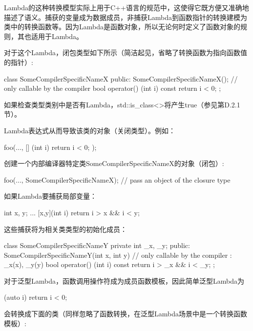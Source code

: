 \begin{notice}
Lambda的这种转换模型实际上用于C++语言的规范中，这使得它既方便又准确地描述了语义。捕获的变量成为数据成员，非捕获Lambda到函数指针的转换建模为类中的转换函数等。因为Lambda是函数对象，所以无论何时定义了函数对象的规则，其也适用于Lambda。
\end{notice}

对于这个Lambda，闭包类型如下所示（简洁起见，省略了转换函数为指向函数值的指针）:

\begin{cpp}
class SomeCompilerSpecificNameX
{
	public:
	SomeCompilerSpecificNameX(); // only callable by the compiler
	bool operator() (int i) const
	{
		return i < 0;
	}
};
\end{cpp}

如果检查类型类别中是否有Lambda，std::is\_class<>将产生true（参见第D.2.1节）。

Lambda表达式从而导致该类的对象（关闭类型）。例如：

\begin{cpp}
foo(...,
	[] (int i) {
		return i < 0;
	});
\end{cpp}

创建一个内部编译器特定类SomeCompilerSpecificNameX的对象（闭包）:

\begin{cpp}
foo(...,
	SomeCompilerSpecificNameX{}); // pass an object of the closure type
\end{cpp}

如果Lambda要捕获局部变量：

\begin{cpp}
int x, y;
...
[x,y](int i) {
	return i > x && i < y;
}
\end{cpp}

这些捕获将为相关类类型的初始化成员：

\begin{cpp}
class SomeCompilerSpecificNameY {
private
	int _x, _y;
public:
	SomeCompilerSpecificNameY(int x, int y) // only callable by the compiler
	: _x(x), _y(y) {
	}
	bool operator() (int i) const {
		return i > _x && i < _y;
	}
};
\end{cpp}

对于泛型Lambda，函数调用操作符成为成员函数模板，因此简单泛型Lambda为

\begin{cpp}
[] (auto i) {
	return i < 0;
}
\end{cpp}

会转换成下面的类（同样忽略了函数转换，在泛型Lambda场景中是一个转换函数模板）:

